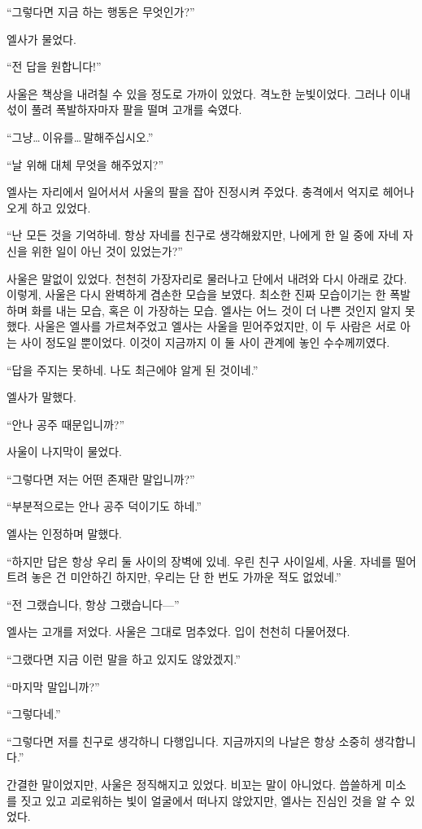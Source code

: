 ``그렇다면 지금 하는 행동은 무엇인가?''

엘사가 물었다.

``전 답을 원합니다!''

사울은 책상을 내려칠 수 있을 정도로 가까이 있었다. 격노한 눈빛이었다. 그러나 이내 섟이 풀려 폭발하자마자 팔을 떨며 고개를 숙였다.

``그냥\ldots\,이유를\ldots\,말해주십시오.''

``날 위해 대체 무엇을 해주었지?''

엘사는 자리에서 일어서서 사울의 팔을 잡아 진정시켜 주었다. 충격에서 억지로 헤어나오게 하고 있었다.

``난 모든 것을 기억하네. 항상 자네를 친구로 생각해왔지만, 나에게 한 일 중에 자네 자신을 위한 일이 아닌 것이 있었는가?''

사울은 말없이 있었다. 천천히 가장자리로 물러나고 단에서 내려와 다시 아래로 갔다. 이렇게, 사울은 다시 완벽하게 겸손한 모습을 보였다. 최소한 진짜 모습이기는 한 폭발하며 화를 내는 모습, 혹은 이 가장하는 모습. 엘사는 어느 것이 더 나쁜 것인지 알지 못했다. 사울은 엘사를 가르쳐주었고 엘사는 사울을 믿어주었지만, 이 두 사람은 서로 아는 사이 정도일 뿐이었다. 이것이 지금까지 이 둘 사이 관계에 놓인 수수께끼였다.

``답을 주지는 못하네. 나도 최근에야 알게 된 것이네.''

엘사가 말했다.

``안나 공주 때문입니까?''

사울이 나지막이 물었다.

``그렇다면 저는 어떤 존재란 말입니까?''

``부분적으로는 안나 공주 덕이기도 하네.''

엘사는 인정하며 말했다.

``하지만 답은 항상 우리 둘 사이의 장벽에 있네. 우린 친구 사이일세, 사울. 자네를 떨어트려 놓은 건 미안하긴 하지만, 우리는 단 한 번도 가까운 적도 없었네.''

``전 그랬습니다, 항상 그랬습니다—''

엘사는 고개를 저었다. 사울은 그대로 멈추었다. 입이 천천히 다물어졌다.

``그랬다면 지금 이런 말을 하고 있지도 않았겠지.''

``마지막 말입니까?''

``그렇다네.''

``그렇다면 저를 친구로 생각하니 다행입니다. 지금까지의 나날은 항상 소중히 생각합니다.''

간결한 말이었지만, 사울은 정직해지고 있었다. 비꼬는 말이 아니었다. 씁쓸하게 미소를 짓고 있고 괴로워하는 빛이 얼굴에서 떠나지 않았지만, 엘사는 진심인 것을 알 수 있었다.

